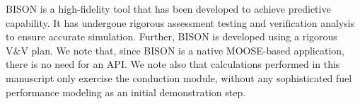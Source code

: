 BISON is a high-fidelity tool that has been developed to achieve predictive capability. It has undergone
rigorous assessment testing and verification analysis to ensure accurate simulation. Further, BISON is
developed using a rigorous V\&V plan. We note that, since BISON is a native MOOSE-based application, there is no need for an API. We note also that calculations performed in this manuscript only exercise the conduction module, without any sophisticated fuel performance modeling as an initial demonstration step.

